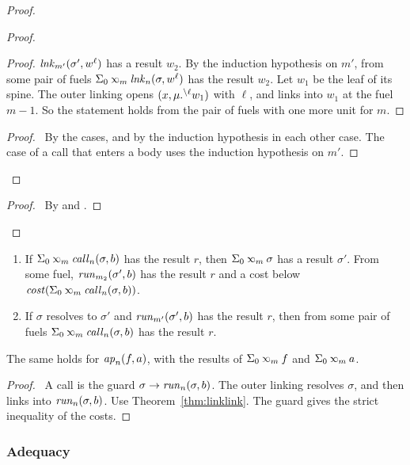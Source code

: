 \begin{proof}
\begin{proof}
\begin{proof}
      $\mathit{lnk}_{m'}(\sigma',{w}^{\ell})$ has a result $w_2$.
      By the induction hypothesis on $m'$, from some pair of fuels $\Sigma_0\lk{m}\lnkv{n}(\sigma,\openloc{\ell}{w})$ has the result $w_2$.
      Let $w_1$ be the leaf of its spine.
      The outer linking opens $(x,\mu.{\prescript{\backslash{\ell}}{}{w_1}})$ with $\ell$, and links into $w_1$ at the fuel $m-1$.
      So the statement holds from the pair of fuels with one more unit for $m$.
    \end{proof}
    \qedstep
    \begin{proof}
      \pf\ By the cases, and by the induction hypothesis in each other case.
      The case of a call that enters a body uses the induction hypothesis on $m'$.
    \end{proof}
  \end{proof}
  \qedstep
  \begin{proof}
    \pf\ By  and .
  \end{proof}
\end{proof}

\begin{cor}[Calls]\label{cor:call}
  \begin{enumerate}
    \item[(a)] If $\Sigma_0\lk{m}\callt{n}(\sigma,b)$ has the result $r$, then $\Sigma_0\lk{m}\sigma$ has a result $\sigma'$.
          From some fuel, $\mathit{run}_{m_2}(\sigma',b)$ has the result $r$ and a cost below $\cost(\Sigma_0\lk{m}\callt{n}(\sigma,b))$.
    \item[(b)] If $\sigma$ resolves to $\sigma'$ and $\mathit{run}_{m'}(\sigma',b)$ has the result $r$, then from some pair of fuels $\Sigma_0\lk{m}\callt{n}(\sigma,b)$ has the result $r$.
  \end{enumerate}
  The same holds for $\mathit{ap}_{n}(f,a)$, with the results of $\Sigma_0\lk{m}f$ and $\Sigma_0\lk{m}a$.
\end{cor}
\begin{proof}
  \pf\ A call is the guard ${\sigma}\rightarrow{\mathit{run}_{n}(\sigma,b)}$.
  The outer linking resolves $\sigma$, and then links into $\mathit{run}_{n}(\sigma,b)$.
  Use Theorem~\ref{thm:linklink}.
  The guard gives the strict inequality of the costs.
\end{proof}

\subsubsection{Adequacy}

